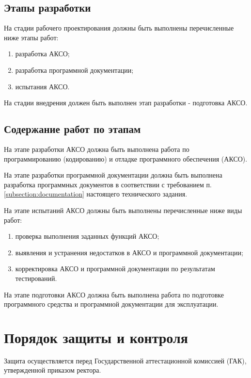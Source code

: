 \documentclass[a4paper,14pt]{extreport}
\begin{document}
	\subsection{Этапы разработки}
	На стадии рабочего проектирования должны быть выполнены перечисленные ниже этапы работ:
	\begin{enumerate}
		\item разработка АКСО; 
		\item разработка программной документации; 
		\item испытания АКСО.
	\end{enumerate}
	
	На стадии внедрения должен быть выполнен этап разработки - подготовка АКСО.
	
	\subsection{Содержание работ по этапам}
	
	На этапе разработки АКСО должна быть выполнена работа по программированию (кодированию) и отладке программного обеспечения (АКСО).
	
	На этапе разработки программной документации должна быть выполнена разработка программных документов в соответствии с требованием п. \ref{subsection:documentation} настоящего технического задания.
	
	На этапе испытаний АКСО должны быть выполнены перечисленные ниже виды работ:
	
	\begin{enumerate}
		\item проверка выполнения заданных функций АКСО;
		\item выявления и устранения недостатков в АКСО и программной документации; 
		\item корректировка АКСО и программной документации по результатам тестирований.
	\end{enumerate}
	
	На этапе подготовки АКСО должна быть выполнена работа по подготовке программного средства и программной документации для эксплуатации.
	
	\section{Порядок защиты и контроля}
	
	Защита осуществляется перед Государственной аттестационной комиссией (ГАК), утвержденной приказом ректора.
	
\end{document}
